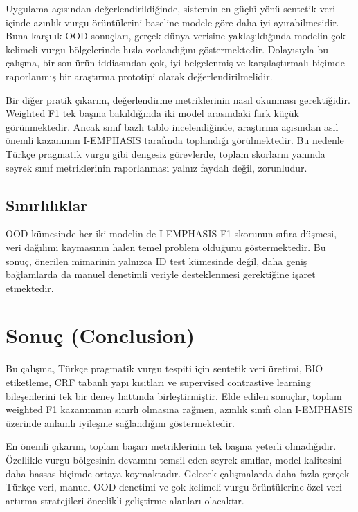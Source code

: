 \documentclass[conference]{IEEEtran}
\begin{document}
Uygulama açısından değerlendirildiğinde, sistemin en güçlü yönü sentetik veri içinde azınlık vurgu örüntülerini baseline modele göre daha iyi ayırabilmesidir. Buna karşılık OOD sonuçları, gerçek dünya verisine yaklaşıldığında modelin çok kelimeli vurgu bölgelerinde hızla zorlandığını göstermektedir. Dolayısıyla bu çalışma, bir son ürün iddiasından çok, iyi belgelenmiş ve karşılaştırmalı biçimde raporlanmış bir araştırma prototipi olarak değerlendirilmelidir.

Bir diğer pratik çıkarım, değerlendirme metriklerinin nasıl okunması gerektiğidir. Weighted F1 tek başına bakıldığında iki model arasındaki fark küçük görünmektedir. Ancak sınıf bazlı tablo incelendiğinde, araştırma açısından asıl önemli kazanımın I-EMPHASIS tarafında toplandığı görülmektedir. Bu nedenle Türkçe pragmatik vurgu gibi dengesiz görevlerde, toplam skorların yanında seyrek sınıf metriklerinin raporlanması yalnız faydalı değil, zorunludur.

\subsection{Sınırlılıklar}
OOD kümesinde her iki modelin de I-EMPHASIS F1 skorunun sıfıra düşmesi, veri dağılımı kaymasının halen temel problem olduğunu göstermektedir. Bu sonuç, önerilen mimarinin yalnızca ID test kümesinde değil, daha geniş bağlamlarda da manuel denetimli veriyle desteklenmesi gerektiğine işaret etmektedir.

\section{Sonuç (Conclusion)}
Bu çalışma, Türkçe pragmatik vurgu tespiti için sentetik veri üretimi, BIO etiketleme, CRF tabanlı yapı kısıtları ve supervised contrastive learning bileşenlerini tek bir deney hattında birleştirmiştir. Elde edilen sonuçlar, toplam weighted F1 kazanımının sınırlı olmasına rağmen, azınlık sınıfı olan I-EMPHASIS üzerinde anlamlı iyileşme sağlandığını göstermektedir.

En önemli çıkarım, toplam başarı metriklerinin tek başına yeterli olmadığıdır. Özellikle vurgu bölgesinin devamını temsil eden seyrek sınıflar, model kalitesini daha hassas biçimde ortaya koymaktadır. Gelecek çalışmalarda daha fazla gerçek Türkçe veri, manuel OOD denetimi ve çok kelimeli vurgu örüntülerine özel veri artırma stratejileri öncelikli geliştirme alanları olacaktır.
\end{document}
